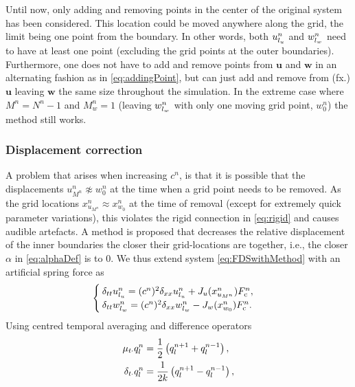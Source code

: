 Until now, only adding and removing points in the center of the original system has been considered. This location could be moved anywhere along the grid, the limit being one point from the boundary. In other words, both $u_{l_u}^n$ and $w_{l_w}^n$ need to have at least one point (excluding the grid points at the outer boundaries). Furthermore, one does not have to add and remove points from $\mathbf{u}$ and $\mathbf{w}$ in an alternating fashion as in \eqref{eq:addingPoint}, but can just add and remove from (fx.) $\mathbf{u}$ leaving $\mathbf{w}$ the same size throughout the simulation. In the extreme case where $M^n = N^n - 1$ and $M_w^n = 1$ (leaving $w_{l_w}^n$ with only one moving grid point, $w_0^n$) the method still works.

\subsubsection{Displacement correction}\label{sec:dispCorr}
A problem that arises when increasing $c^n$, is that it is possible that the displacements $u_{M^n}^n \not\approx w_0^n$ at the time when a grid point needs to be removed. As the grid locations $x_{u_{M^n}}^n \approx x_{w_0}^n$ at the time of removal (except for extremely quick parameter variations), this violates the rigid connection in \eqref{eq:rigid} and causes audible artefacts. A method is proposed that decreases the relative displacement of the inner boundaries the closer their grid-locations are together, i.e., the closer $\alpha$ in \eqref{eq:alphaDef} is to 0. We thus extend system \eqref{eq:FDSwithMethod} with an artificial spring force as
\begin{equation}\label{eq:sysDispCorr}
\begin{cases}
    \delta_{tt}u_\lu^n = (c^n)^2\delta_{xx}u_\lu^n+ J_u(x_{u_{M^n}}^n)%
    F_\text{c}^n,\\
    \delta_{tt}w_\lw^n = (c^n)^2\delta_{xx}w_\lw^n - J_w(x_{w_0}^n)%
    F_\text{c}^n.
\end{cases}
\end{equation}
Using centred temporal averaging and difference operators
\begin{subequations}\label{eq:centredOperators}
\begin{align}\label{eq:centredAverage}
    \mu_{t\cdot}q_l^n &= \frac{1}{2} \left(q_l^{n+1} + q_l^{n-1}\right),\\
    \delta_{t\cdot}q_l^n &= \frac{1}{2k} \left(q_l^{n+1} - q_l^{n-1}\right),
\end{align}
\end{subequations}
